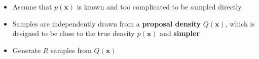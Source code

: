 
\begin{itemize}
	\item Assume that $p(\mathbf{x})$ is known and too complicated to be sampled directly. 
	\item Samples are independently drawn from a \textbf{proposal density} $Q(\mathbf{x})$, which is designed to be close to the true density $p(\mathbf{x})$ and \textbf{simpler}
	\item Generate $R$ samples from $Q(\mathbf{x})$
\end{itemize}
